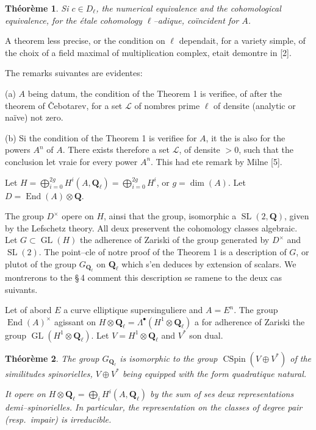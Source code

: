 \documentclass[11pt,a4paper]{article}
\theoremstyle{plain}
\newtheorem{theorem}{Th\'eor\`eme}
\theoremstyle{definition}
\DeclareMathOperator{\End}{End}
\DeclareMathOperator{\CSpin}{CSpin}
\DeclareMathOperator{\SL}{SL}
\DeclareMathOperator{\GL}{GL}
\begin{document}
\begin{theorem}
Si $c \in D_\ell$, the numerical equivalence and the cohomological equivalence, for the étale cohomology $\ell$--adique, co\"incident for $A$.
\end{theorem}

A theorem less precise, or the condition on $\ell$ dependait, for a variety simple, of the choix of a field maximal of multiplication complex, etait demontre in [2].

The remarks suivantes are evidentes:

(a) $A$ being datum, the condition of the Theorem 1 is verifiee, of after the theorem of \v{C}ebotarev, for a set $\mathcal{L}$ of nombres prime $\ell$ of densite (analytic or na\"ive) not zero.

(b) Si the condition of the Theorem 1 is verifiee for $A$, it the is also for the powers $A^n$ of $A$. There exists therefore a set $\mathcal{L}$, of densite $> 0$, such that the conclusion let vraie for every power $A^n$. This had ete remark by Milne [5].

Let $H = \bigoplus_{i=0}^{2g} H^i(A, \mathbf{Q}_\ell) = \bigoplus_{i=0}^{2g} H^i$, or $g = \dim(A)$. Let $D = \End(A) \otimes \mathbf{Q}$.

The group $D^\times$ opere on $H$, ainsi that the group, isomorphic a $\SL(2, \mathbf{Q})$, given by the Lefschetz theory. All deux preservent the cohomology classes algebraic. Let $G \subset \GL(H)$ the adherence of Zariski of the group generated by $D^\times$ and $\SL(2)$. The point--cle of notre proof of the Theorem 1 is a description of $G$, or plutot of the group $G_{\mathbf{Q}_\ell}$ on $\mathbf{Q}_\ell$ which s'en deduces by extension of scalars. We montrerons to the \S\,4 comment this description se ramene to the deux cas suivants.

Let of abord $E$ a curve elliptique supersinguliere and $A = E^n$. The group $\End(A)^\times$ agissant on $H \otimes \mathbf{Q}_\ell = \Lambda^\bullet(H^1 \otimes \mathbf{Q}_\ell)$ a for adherence of Zariski the group $\GL(H^1 \otimes \mathbf{Q}_\ell)$. Let $V = H^1 \otimes \mathbf{Q}_\ell$ and $V^*$ son dual.

\begin{theorem}
The group $G_{\mathbf{Q}_\ell}$ is isomorphic to the group $\CSpin(V \oplus V^*)$ of the similitudes spinorielles, $V \oplus V^*$ being equipped with the form quadratique natural.

It opere on $H \otimes \mathbf{Q}_\ell = \bigoplus_i H^i(A, \mathbf{Q}_\ell)$ by the sum of ses deux representations demi--spinorielles. In particular, the representation on the classes of degree pair (resp.\ impair) is irreducible.
\end{theorem}
\end{document}
